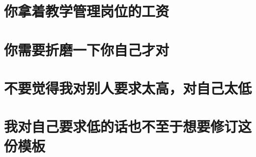 \documentclass[a4paper,AutoFakeBold,oneside,12pt]{book}
\begin{document}
\section{你拿着教学管理岗位的工资}
\section{你需要折磨一下你自己才对}
\section{不要觉得我对别人要求太高，对自己太低}
\section{我对自己要求低的话也不至于想要修订这份模板}
\end{document}
